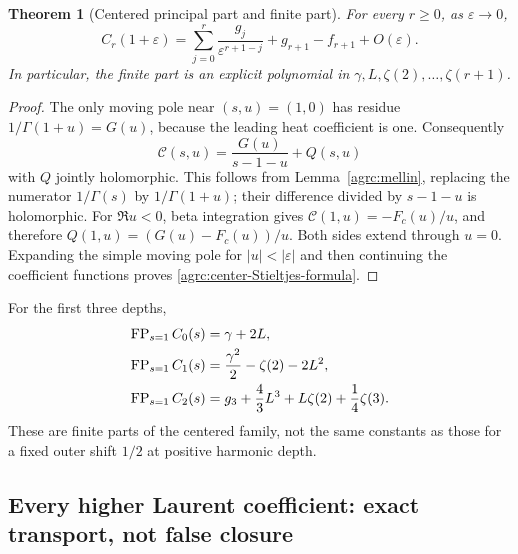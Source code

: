 \documentclass[11pt]{article}
\numberwithin{equation}{section}
\newtheorem{theorem}{Theorem}[section]
\theoremstyle{definition}\newtheorem{definition}[theorem]{Definition}
\theoremstyle{remark}\newtheorem{remark}[theorem]{Remark}
\newcommand{\Ccal}{\mathcal C}
\newcommand{\FP}{\operatorname{FP}}
\begin{document}
\begin{theorem}[Centered principal part and finite part]
\label{agrc:center-Stieltjes}
For every $r\geq0$, as $\varepsilon\to0$,
\begin{equation}\label{agrc:center-Stieltjes-formula}
 \boxed{\displaystyle
 C_r(1+\varepsilon)=
 \sum_{j=0}^r\frac{g_j}{\varepsilon^{r+1-j}}
                +g_{r+1}-f_{r+1}+O(\varepsilon).}
\end{equation}
In particular, the finite part is an explicit polynomial in
$\gamma,L,\zeta(2),\ldots,\zeta(r+1)$.
\end{theorem}
\begin{proof}
The only moving pole near $(s,u)=(1,0)$ has residue
$1/\Gamma(1+u)=G(u)$, because the leading heat coefficient is one.
Consequently
\[
 \Ccal(s,u)=\frac{G(u)}{s-1-u}+Q(s,u)
\]
with $Q$ jointly holomorphic. This follows from
Lemma~\ref{agrc:mellin}, replacing the numerator $1/\Gamma(s)$ by
$1/\Gamma(1+u)$; their difference divided by $s-1-u$ is holomorphic.
For $\Re u<0$, beta integration gives
$\Ccal(1,u)=-F_c(u)/u$, and therefore
$Q(1,u)=(G(u)-F_c(u))/u$. Both sides extend through $u=0$.
Expanding the simple moving pole for $|u|<|\varepsilon|$ and then
continuing the coefficient functions proves
\eqref{agrc:center-Stieltjes-formula}.
\end{proof}

For the first three depths,
\begin{align}
 \FP_{s=1}C_0(s)&=\gamma+2L,\notag\\
 \FP_{s=1}C_1(s)&=\frac{\gamma^2}{2}-\zeta(2)-2L^2,\notag\\
 \FP_{s=1}C_2(s)&=g_3+\frac43L^3+L\zeta(2)+\frac14\zeta(3).
 \label{agrc:center-FP-examples}
\end{align}
These are finite parts of the centered family, not the same constants
as those for a fixed outer shift $1/2$ at positive harmonic depth.

\subsection{Every higher Laurent coefficient: exact transport, not false closure}
\end{document}
